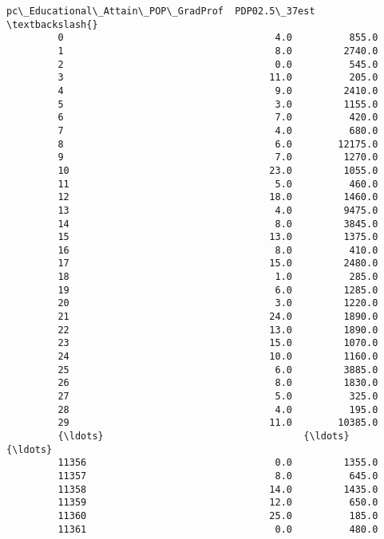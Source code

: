 \documentclass[11pt]{article}
\begin{document}
\begin{Verbatim}[commandchars=\\\{\}]
                pc\_Educational\_Attain\_POP\_GradProf  PDP02.5\_37est  \textbackslash{}
         0                                     4.0          855.0   
         1                                     8.0         2740.0   
         2                                     0.0          545.0   
         3                                    11.0          205.0   
         4                                     9.0         2410.0   
         5                                     3.0         1155.0   
         6                                     7.0          420.0   
         7                                     4.0          680.0   
         8                                     6.0        12175.0   
         9                                     7.0         1270.0   
         10                                   23.0         1055.0   
         11                                    5.0          460.0   
         12                                   18.0         1460.0   
         13                                    4.0         9475.0   
         14                                    8.0         3845.0   
         15                                   13.0         1375.0   
         16                                    8.0          410.0   
         17                                   15.0         2480.0   
         18                                    1.0          285.0   
         19                                    6.0         1285.0   
         20                                    3.0         1220.0   
         21                                   24.0         1890.0   
         22                                   13.0         1890.0   
         23                                   15.0         1070.0   
         24                                   10.0         1160.0   
         25                                    6.0         3885.0   
         26                                    8.0         1830.0   
         27                                    5.0          325.0   
         28                                    4.0          195.0   
         29                                   11.0        10385.0   
         {\ldots}                                   {\ldots}            {\ldots}   
         11356                                 0.0         1355.0   
         11357                                 8.0          645.0   
         11358                                14.0         1435.0   
         11359                                12.0          650.0   
         11360                                25.0          185.0   
         11361                                 0.0          480.0   

\end{Verbatim}
\end{document}
